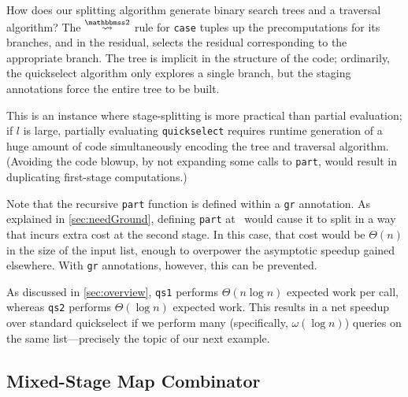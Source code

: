 How does our splitting algorithm generate binary search trees and a traversal
algorithm? The $\splittwosym$ rule for \texttt{case} tuples up the
precomputations for its branches, and in the residual, selects the residual
corresponding to the appropriate branch. The tree is implicit in the structure
of the code; ordinarily, the quickselect algorithm only explores a single
branch, but the staging annotations force the entire tree to be built.

This is an instance where stage-splitting is more practical than partial
evaluation; if $l$ is large, partially evaluating \texttt{quickselect} requires
runtime generation of a huge amount of code simultaneously encoding the tree and
traversal algorithm. (Avoiding the code blowup, by not expanding some calls to
\texttt{part}, would result in duplicating first-stage computations.)

Note that the recursive \texttt{part} function is defined within a \texttt{gr}
annotation.  As explained in \ref{sec:needGround}, defining \texttt{part}
at \bbonem\ would cause it to split in a way that incurs extra cost at the second stage.
In this case, that cost would be $\Theta(n)$ in the size of the input list,
enough to overpower the asymptotic speedup gained elsewhere.
With \texttt{gr} annotations, however, this can be prevented.

As discussed in \ref{sec:overview}, \texttt{qs1} performs $\Theta(n \log n)$ expected work per call, 
whereas \texttt{qs2} performs $\Theta(\log n)$ expected work.  
This results in a net speedup over standard quickselect if we 
perform many (specifically, $\omega(\log n)$) queries on
the same list---precisely the topic of our next example. 

\subsection {Mixed-Stage Map Combinator}


